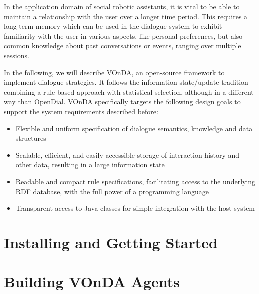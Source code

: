\documentclass[a4paper]{report}
\newcommand{\vonda}{VOnDA\xspace}
\begin{document}
In the application domain of social robotic assistants, it is vital to be able
to maintain a relationship with the user over a longer time period. This requires a long-term
memory which can be used in the dialogue system to exhibit familiarity with the
user in various aspects, like personal preferences, but also common knowledge
about past conversations or events, ranging over multiple sessions.

In the following, we will describe \vonda, an open-source framework to
implement dialogue strategies. It follows the information state/update
tradition \citep{traum2003information}
combining a rule-based approach with statistical selection, although in a
different way than OpenDial. \vonda specifically targets the following design
goals to support the system requirements described before:

\begin{itemize}
  \addtolength{\itemsep}{-.6\itemsep}
\item Flexible and uniform specification of dialogue semantics, knowledge and
  data structures
\item Scalable, efficient, and easily accessible storage of interaction history
  and other data, resulting in a large information state
\item Readable and compact rule specifications, facilitating access to the
  underlying RDF database, with the full power of a programming language
\item Transparent access to Java classes for simple integration with the host
  system
\end{itemize}
\fi



%

\chapter{Installing and Getting Started}


\newpage

\newpage


\chapter{Building VOnDA Agents}

\newpage



\end{document}

